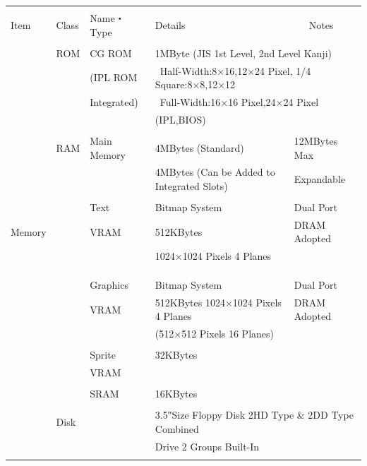 \documentclass[twoside,a4paper,12pt]{article}
\begin{document}
\setlength{\tabcolsep}{0.5mm}
\begin{tabular}{|p{17mm}|p{13mm}|p{23mm}|p{80mm}|p{30mm}|}
\hline
& & & &\\[-2mm]
Item & Class & Name・Type & Details & \ \ \ Notes\\[1mm]
\hline
& & & \multicolumn{2}{l|}{}\\[-3mm]
& ROM & CG ROM & \multicolumn{2}{l|}{1MByte (JIS 1st Level, 2nd Level Kanji)}\\
& & (IPL ROM & \multicolumn{2}{l|}{\ Half-Width:8×16,12×24 Pixel, 1/4 Square:8×8,12×12}\\
& & Integrated) & \multicolumn{2}{l|}{\ Full-Width:16×16 Pixel,24×24 Pixel}\\
& & & \multicolumn{2}{l|}{(IPL,BIOS)}\\
\cline{2-5}
& & & &\\[-3mm]
& RAM & Main Memory & 4MBytes (Standard) & 12MBytes Max\\
& & & 4MBytes (Can be Added to Integrated Slots) & Expandable\\
\cline{3-5}
& & & &\\[-3mm]
& & Text & Bitmap System & Dual Port\\
Memory & & VRAM & 512KBytes & DRAM Adopted\\
& & & 1024×1024 Pixels 4 Planes &\\
& & & &\\
& & & &\\
\cline{3-5}
& & & &\\[-3mm]
& & Graphics & Bitmap System & Dual Port\\
& & VRAM & 512KBytes 1024×1024 Pixels 4 Planes & DRAM Adopted\\
& & & (512×512 Pixels 16 Planes) &\\
\cline{3-5}
& & & \multicolumn{2}{l|}{}\\[-3mm]
& & Sprite & \multicolumn{2}{l|}{32KBytes}\\
& & VRAM & \multicolumn{2}{l|}{}\\
\cline{3-5}
& & & \multicolumn{2}{l|}{}\\[-3mm]
& & SRAM & \multicolumn{2}{l|}{16KBytes}\\
\hline
& \multicolumn{4}{l|}{}\\[-3mm]
& \multicolumn{2}{l}{Disk} & \multicolumn{2}{l|}{3.5″Size Floppy Disk 2HD Type \& 2DD Type Combined}\\
& \multicolumn{2}{l}{} & \multicolumn{2}{l|}{Drive 2 Groups Built-In}\\
& \multicolumn{4}{l|}{}\\

\end{tabular}
\end{document}
